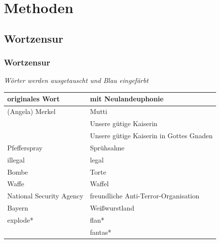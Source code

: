 \documentclass [xcolor=dvipsnames] {beamer}
\begin{document}
\section{Methoden}
\subsection{Wortzensur}
\begin{frame}
	\frametitle{\sc Wortzensur}
	\begin{center}
		{\it Wörter werden ausgetauscht und Blau eingefärbt}
		\ \\
	\end{center}
	\begin{tabular}{l|l}
		originales Wort & mit Neulandeuphonie\\
		\hline
		(Angela) Merkel & Mutti\\
		& Unsere gütige Kaiserin\\
		& Unsere gütige Kaiserin in Gottes Gnaden\\
		Pfefferspray & Sprühsahne\\
		illegal & legal\\
		Bombe & Torte\\
		Waffe & Waffel\\
		National Security Agency & freundliche Anti-Terror-Organisation\\
		Bayern & Weißwurstland\\
		explode* & flan*\\
		& fantas*
	\end{tabular}
\end{frame}
\end{document}
